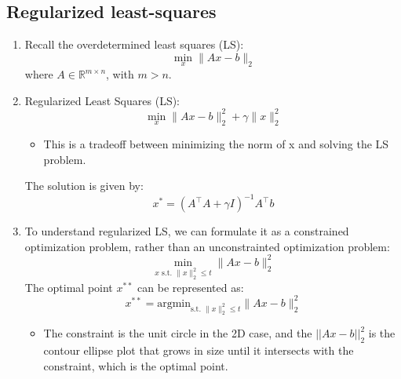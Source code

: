 \subsection{Regularized least-squares}
\begin{derivation}
    \begin{enumerate}
        \item Recall the overdetermined least squares (LS):
        \[
        \min_x \|Ax - b\|_2
        \]
        where $A \in \mathbb{R}^{m \times n}$, with $m > n$.
    
        \item Regularized Least Squares (LS):
        \[
        \min_x \|Ax - b\|_2^2 + \gamma \|x\|_2^2
        \]
        \begin{itemize}
            \item This is a tradeoff between minimizing the norm of x and solving the LS problem.
        \end{itemize}
        The solution is given by:
        \[
        x^* = \left(A^\top A + \gamma I\right)^{-1} A^\top b
        \]
    
        \item To understand regularized LS, we can formulate it as a constrained optimization problem, rather than an unconstrainted optimization problem:
        \[
        \min_{x \text{ s.t. } \|x\|_2^2 \leq t} \|Ax - b\|_2^2 
        \]
        The optimal point $x^{**}$ can be represented as:
        \[
        x^{**} = \text{argmin}_{\text{s.t. } \|x\|_2^2 \leq t} \|Ax - b\|_2^2 
        \]
        \begin{itemize}
            \item The constraint is the unit circle in the 2D case, and the $||Ax-b||_2^2$ is the contour ellipse plot that grows in size until it intersects with the constraint, which is the optimal point. 
        \end{itemize}
    \end{enumerate}
\end{derivation}

